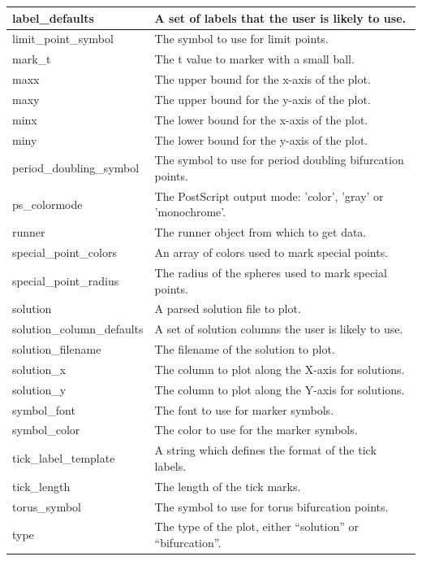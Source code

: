 \documentclass[12pt]{report}
\begin{document}
\begin{longtable}{| l | l |}
 \hline
 label\_defaults  & A set of labels that the user is likely to use. \\
 \hline
 limit\_point\_symbol  &    The symbol to use for limit points. \\ 
 \hline
 mark\_t  &  The t value to marker with a small ball. \\      
 \hline
 maxx  & The upper bound for the x-axis of the plot. \\
 \hline
 maxy  & The upper bound for the y-axis of the plot. \\
 \hline
 minx  &  The lower bound for the x-axis of the plot. \\
 \hline
 miny  & The lower bound for the y-axis of the plot. \\
 \hline
 period\_doubling\_symbol  &   The symbol to use for period doubling bifurcation points. \\ 
 \hline
 ps\_colormode  & The PostScript output mode: 'color', 'gray' or 'monochrome'. \\ 
 \hline
 runner  &  The runner object from which to get data. \\       
 \hline
 special\_point\_colors  &    An array of colors used to mark special points. \\ 
 \hline
 special\_point\_radius  &    The radius of the spheres used to mark special points. \\ 
 \hline
 solution  &  A parsed solution file to plot. \\
 \hline
 solution\_column\_defaults  & A set of solution columns the user is likely to use.\\
 \hline
 solution\_filename  & The filename of the solution to plot. \\
 \hline
 solution\_x  &  The column to plot along the X-axis for solutions. \\
 \hline
 solution\_y  & The column to plot along the Y-axis for solutions. \\
 \hline
 symbol\_font  &  The font to use for marker symbols. \\
 \hline
 symbol\_color  & The color to use for the marker symbols. \\
 \hline
 tick\_label\_template  & A string which defines the format of the tick labels. \\
 \hline
 tick\_length  &  The length of the tick marks. \\
 \hline
 torus\_symbol  &    The symbol to use for torus bifurcation points. \\ 
 \hline
 type  & The type of the plot, either ``solution'' or ``bifurcation''. \\  

\end{longtable}
\end{document}
